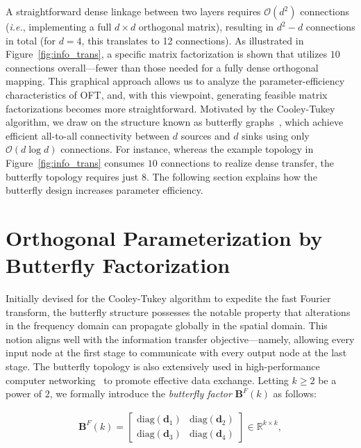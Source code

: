 A straightforward dense linkage between two layers requires $\mathcal{O}(d^2)$ connections (\emph{i.e.}, implementing a full $d\times d$ orthogonal matrix), resulting in $d^2-d$ connections in total (for $d=4$, this translates to 12 connections). As illustrated in Figure~\ref{fig:info_trans}, a specific matrix factorization is shown that utilizes $10$ connections overall—fewer than those needed for a fully dense orthogonal mapping. This graphical approach allows us to analyze the parameter-efficiency characteristics of OFT, and, with this viewpoint, generating feasible matrix factorizations becomes more straightforward. Motivated by the Cooley-Tukey algorithm, we draw on the structure known as butterfly graphs~\cite{cooley1965algorithm}, which achieve efficient all-to-all connectivity between $d$ sources and $d$ sinks using only $\mathcal{O}(d\log d)$ connections. For instance, whereas the example topology in Figure~\ref{fig:info_trans} consumes $10$ connections to realize dense transfer, the butterfly topology requires just $8$. The following section explains how the butterfly design increases parameter efficiency.

\section{Orthogonal Parameterization by Butterfly Factorization}

Initially devised for the Cooley-Tukey algorithm to expedite the fast Fourier transform, the butterfly structure possesses the notable property that alterations in the frequency domain can propagate globally in the spatial domain. This notion aligns well with the information transfer objective—namely, allowing every input node at the first stage to communicate with every output node at the last stage. The butterfly topology is also extensively used in high-performance computer networking~\cite{solihin2015fundamentals,li2011linear} to promote effective data exchange. Letting $k\geq 2$ be a power of $2$, we formally introduce the \emph{butterfly factor} $\bm{B}^F(k)$ as follows:

\begin{equation}\label{eq:but_factor}
\begin{aligned}
    \bm{B}^F(k)=\begin{bmatrix}
    \text{diag}(\bm{d}_1) & \text{diag}(\bm{d}_2) \\
    \text{diag}(\bm{d}_3) & \text{diag}(\bm{d}_4)
    \end{bmatrix}\in\mathbb{R}^{k\times k},
\end{aligned}
\end{equation}

